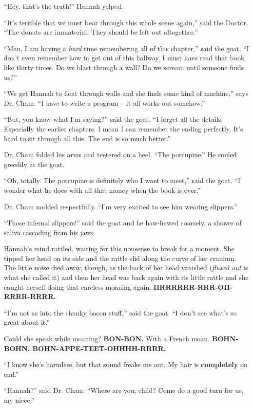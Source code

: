 \documentclass[10pt,twoside]{report}
\begin{document}
``Hey, that's the truth!'' Hannah yelped.

``It's terrible that we must bear through this whole scene again,''
said the Doctor.  ``The donuts are immaterial.  They should be left
out altogether.''

``Man, I am having a {\em hard} time remembering all of this
chapter,'' said the goat.  ``I don't even remember how to get out of
this hallway.  I must have read that book like thirty times.  Do we
blast through a wall?  Do we scream until someone finds us?''

``We get Hannah to float through walls and she finds some kind of
machine,'' says Dr. Cham.  ``I have to write a program -- it all works
out somehow.''

``But, you know what I'm saying?'' said the goat.  ``I forget all the
details. Especially the earlier chapters.  I mean I can remember the
ending perfectly. It's hard to sit through all this.  The end is so
much better.''

Dr. Cham folded his arms and teetered on a heel.  ``The porcupine.''
He smiled greedily at the goat.

``Oh, totally.  The porcupine is definitely who I want to meet,'' said
the goat.  ``I wonder what he does with all that money when the book
is over.''

Dr. Cham nodded respectfully.  ``I'm very excited to see him wearing
slippers.''

``Those infernal slippers!'' said the goat and he haw-hawed coarsely,
a shower of saliva cascading from his jaws.

Hannah's mind rattled, waiting for this nonsense to break for a
moment. She tipped her head on its side and the rattle slid along the
curve of her cranium.  The little noise died away, though, as the back
of her head vanished ({\em fluxed out} is what she called it) and then
her head was back again with its little rattle and she caught herself
doing that careless moaning again.  {\bf HRRRRRR-RRR-OH-RRRR-RRRR.}

``I'm not as into the chunky bacon stuff,'' said the goat.  ``I don't
see what's so great about it.''

Could she speak while moaning? {\bf BON-BON.}  With a French moan.
{\bf BOHN-BOHN. BOHN-APPE-TEET-OHHHH-RRRR.}

``I know she's harmless, but that sound freaks me out.  My hair is
{\bf completely} on end.''

``Hannah?'' said Dr. Cham.  ``Where are you, child?  Come do a good
turn for us, my niece.''
\end{document}
